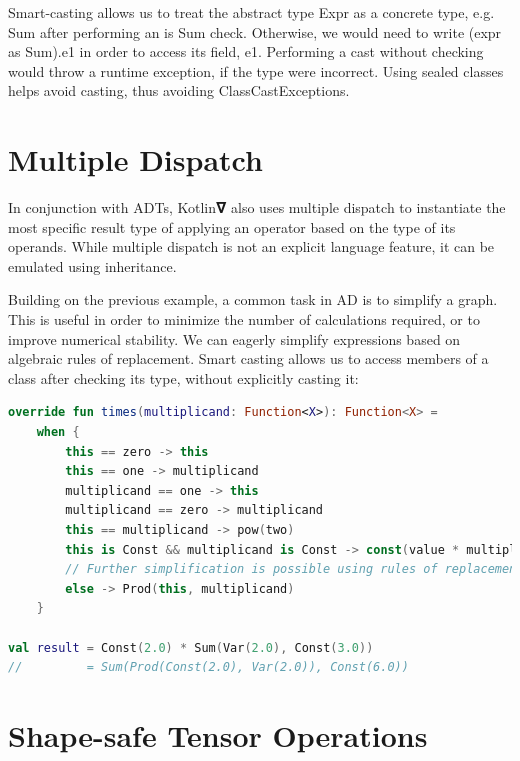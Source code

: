 \documentclass[12pt,initial,twoside,maitrise]{dms}
\numberwithin{equation}{section}
\numberwithin{table}{chapter}
\numberwithin{figure}{chapter}
\begin{document}
Smart-casting allows us to treat the abstract type Expr as a concrete type, e.g. Sum after performing an is Sum check. Otherwise, we would need to write (expr as Sum).e1 in order to access its field, e1. Performing a cast without checking would throw a runtime exception, if the type were incorrect. Using sealed classes helps avoid casting, thus avoiding ClassCastExceptions.

\section{Multiple Dispatch}

In conjunction with ADTs, Kotlin𝛁 also uses multiple dispatch to instantiate the most specific result type of applying an operator based on the type of its operands. While multiple dispatch is not an explicit language feature, it can be emulated using inheritance.

Building on the previous example, a common task in AD is to simplify a graph. This is useful in order to minimize the number of calculations required, or to improve numerical stability. We can eagerly simplify expressions based on algebraic rules of replacement. Smart casting allows us to access members of a class after checking its type, without explicitly casting it:

\begin{lstlisting}[caption={Multiple dispatch allows us to put all related control flow on a single abstract class which is inherited by subclasses, simplifying readability, debugging and refactoring.}, language=Kotlin]
override fun times(multiplicand: Function<X>): Function<X> =
    when {
        this == zero -> this
        this == one -> multiplicand
        multiplicand == one -> this
        multiplicand == zero -> multiplicand
        this == multiplicand -> pow(two)
        this is Const && multiplicand is Const -> const(value * multiplicand.value)
        // Further simplification is possible using rules of replacement
        else -> Prod(this, multiplicand)
    }

val result = Const(2.0) * Sum(Var(2.0), Const(3.0))
//         = Sum(Prod(Const(2.0), Var(2.0)), Const(6.0))
\end{lstlisting}

\section{Shape-safe Tensor Operations}\label{sec:shape-safe-tensor-operations}
\end{document}

